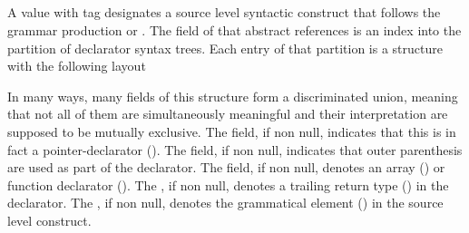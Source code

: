 \subsection{}
\label{sec:ifc:SyntaxSort:Declarator}

A  value with tag  designates a source level syntactic construct that
follows the grammar production  or .
The  field of that abstract references is an index into the partition of declarator syntax trees.
Each entry of that partition is a structure with the following layout
%
\begin{figure}[H]
	\centering
	\label{fig:ifc:SyntaxSort:Declarator}
\end{figure}
%
In many ways, many fields of this structure form a discriminated union, meaning that not all of them are simultaneously meaningful and their interpretation are supposed to be mutually exclusive.
The  field, if non null, indicates that this is in fact a pointer-declarator ().
The  field, if non null, indicates that outer parenthesis are used as part of the declarator.
The  field, if non null, denotes an array () or function declarator ().
The , if non null, denotes a trailing return type () in the declarator.
The , if non null, denotes the  grammatical element () in the source level construct.
